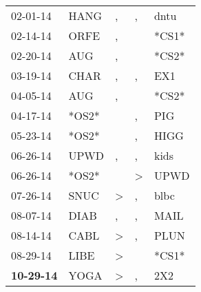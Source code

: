 \begin{supertabular}{p{0.07\textwidth}p{0.06\textwidth}p{0.02\textwidth}p{0.02\textwidth}p{0.06\textwidth}}
          02-01-14\textsuperscript{} &           HANG\textsuperscript{} &                , &                , &           dntu\textsuperscript{} \\
          02-14-14\textsuperscript{} &           ORFE\textsuperscript{} &                , &                  &                            *CS1* \\
          02-20-14\textsuperscript{} &            AUG\textsuperscript{} &                , &                  &                            *CS2* \\
          03-19-14\textsuperscript{} &           CHAR\textsuperscript{} &                , &                , &            EX1\textsuperscript{} \\
          04-05-14\textsuperscript{} &            AUG\textsuperscript{} &                , &                  &                            *CS2* \\
          04-17-14\textsuperscript{} &                            *OS2* &                  &                , &            PIG\textsuperscript{} \\
          05-23-14\textsuperscript{} &                            *OS2* &                  &                , &           HIGG\textsuperscript{} \\
          06-26-14\textsuperscript{} &           UPWD\textsuperscript{} &                , &                , &           kids\textsuperscript{} \\
          06-26-14\textsuperscript{} &                            *OS2* &                  &     \textgreater &           UPWD\textsuperscript{} \\
          07-26-14\textsuperscript{} &           SNUC\textsuperscript{} &     \textgreater &                , &           blbc\textsuperscript{} \\
          08-07-14\textsuperscript{} &           DIAB\textsuperscript{} &                , &                , &           MAIL\textsuperscript{} \\
          08-14-14\textsuperscript{} &           CABL\textsuperscript{} &     \textgreater &                , &           PLUN\textsuperscript{} \\
          08-29-14\textsuperscript{} &           LIBE\textsuperscript{} &     \textgreater &                  &                            *CS1* \\
 \textbf{10-29-14\textsuperscript{}} &           YOGA\textsuperscript{} &     \textgreater &                , &            2X2\textsuperscript{} \\

\end{supertabular}
